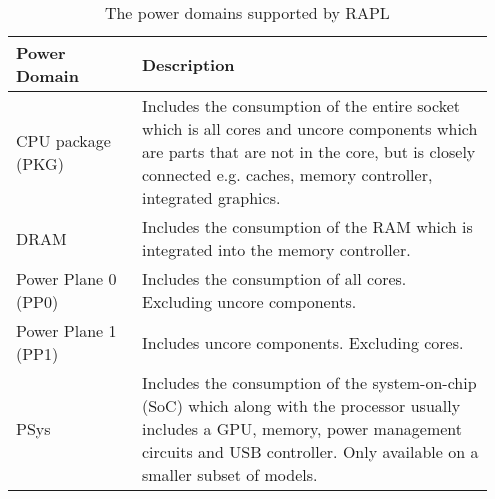 \begin{table}
    \begin{tabular}{| p{0.25\linewidth} | p{0.7\linewidth}|}
    \hline
    \textbf{Power Domain}  & \textbf{Description}                            \\ \hline
    CPU package (PKG)        & Includes the consumption of the entire socket which is all cores and uncore components which are parts that are not in the core, but is closely connected e.g. caches, memory controller, integrated graphics.       \\ \hline
    DRAM                & Includes the consumption of the RAM which is integrated into the memory controller.                       \\ \hline
    Power Plane 0 (PP0)                 & Includes the consumption of all cores. Excluding uncore components.               \\ \hline
    Power Plane 1 (PP1)      & Includes uncore components. Excluding cores.           \\ \hline
    PSys & Includes the consumption of the system-on-chip (SoC) which along with the processor usually includes a GPU, memory, power management circuits and USB controller. Only available on a smaller subset of models.       \\ \hline
    \end{tabular}
    \caption{The power domains supported by RAPL}
    \label{tab:RAPL_Domain}
    \end{table}